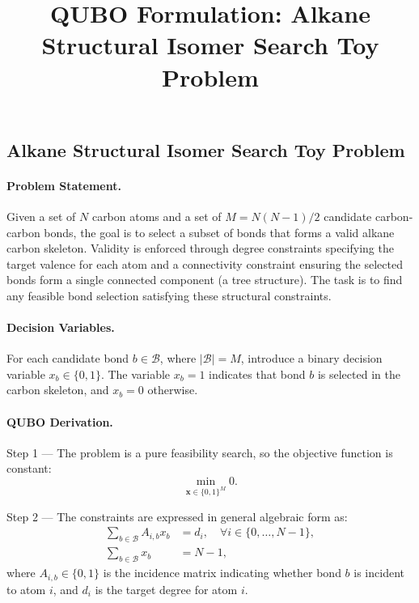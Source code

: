 \documentclass[12pt]{article}
\title{QUBO Formulation: Alkane Structural Isomer Search Toy Problem}
\date{}
\begin{document}
\maketitle

\subsection*{Alkane Structural Isomer Search Toy Problem}

\paragraph{Problem Statement.}
Given a set of $N$ carbon atoms and a set of $M = N(N-1)/2$ candidate carbon-carbon bonds, the goal is to select a subset of bonds that forms a valid alkane carbon skeleton. Validity is enforced through degree constraints specifying the target valence for each atom and a connectivity constraint ensuring the selected bonds form a single connected component (a tree structure). The task is to find any feasible bond selection satisfying these structural constraints.

\paragraph{Decision Variables.}
For each candidate bond $b \in \mathcal{B}$, where $|\mathcal{B}| = M$, introduce a binary decision variable $x_b \in \{0,1\}$. The variable $x_b = 1$ indicates that bond $b$ is selected in the carbon skeleton, and $x_b = 0$ otherwise.

\paragraph{QUBO Derivation.}
Step 1 --- The problem is a pure feasibility search, so the objective function is constant:
\[ \min_{\mathbf{x} \in \{0,1\}^M} 0. \]

Step 2 --- The constraints are expressed in general algebraic form as:
\begin{align}
\sum_{b \in \mathcal{B}} A_{i,b} x_b &= d_i, \quad \forall i \in \{0, \dots, N-1\}, \\
\sum_{b \in \mathcal{B}} x_b &= N - 1,
\end{align}
where $A_{i,b} \in \{0,1\}$ is the incidence matrix indicating whether bond $b$ is incident to atom $i$, and $d_i$ is the target degree for atom $i$.
\end{document}
